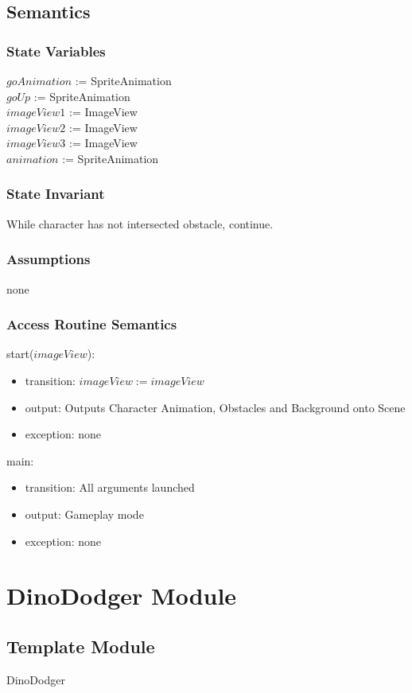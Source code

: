 \documentclass[12pt, titlepage]{article}
\begin{document}
\subsection {Semantics}
\subsubsection {State Variables}
$goAnimation$ := SpriteAnimation\\
$goUp$ := SpriteAnimation\\
$imageView1$ := ImageView\\
$imageView2$ := ImageView\\
$imageView3$ := ImageView\\
$animation$ := SpriteAnimation\\
\subsubsection {State Invariant}
While character has not intersected obstacle, continue.
\subsubsection {Assumptions}
none
\subsubsection {Access Routine Semantics}
start($imageView$):
\begin{itemize}
\item transition: $imageView := imageView$ 
\item output: Outputs Character Animation, Obstacles and Background onto Scene
\item exception: none
\end{itemize}
\noindent main:
\begin{itemize}
\item transition: All arguments launched
\item output: Gameplay mode
\item exception: none
\end{itemize}

\newpage
\section {DinoDodger Module}
\subsection{Template Module}
DinoDodger
\end{document}
